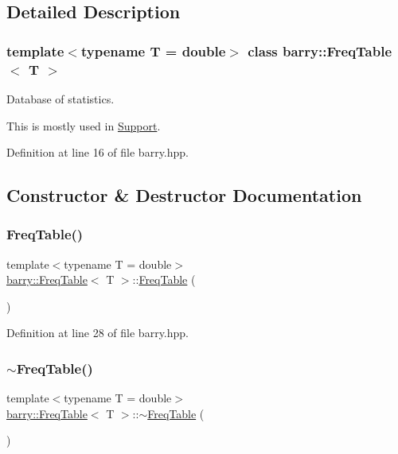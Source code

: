 \subsection{Detailed Description}
\subsubsection*{template$<$typename T = double$>$\newline
class barry\+::\+Freq\+Table$<$ T $>$}

Database of statistics. 

This is mostly used in {\ttfamily \hyperlink{classbarry_1_1_support}{Support}}. 

Definition at line 16 of file barry.\+hpp.



\subsection{Constructor \& Destructor Documentation}
\mbox{\label{classbarry_1_1_freq_table_aea4b22f8097950c3d78e81ab2ed38ae1}} 
\subsubsection{\texorpdfstring{Freq\+Table()}{FreqTable()}}
{\footnotesize\ttfamily template$<$typename T  = double$>$ \\
\hyperlink{classbarry_1_1_freq_table}{barry\+::\+Freq\+Table}$<$ T $>$\+::\hyperlink{classbarry_1_1_freq_table}{Freq\+Table} (\begin{DoxyParamCaption}{ }\end{DoxyParamCaption})\hspace{0.3cm}{\ttfamily [inline]}}



Definition at line 28 of file barry.\+hpp.

\mbox{\label{classbarry_1_1_freq_table_a420a7e4e6740ed7f2b0db1a238f53713}} 
\subsubsection{\texorpdfstring{$\sim$\+Freq\+Table()}{~FreqTable()}}
{\footnotesize\ttfamily template$<$typename T  = double$>$ \\
\hyperlink{classbarry_1_1_freq_table}{barry\+::\+Freq\+Table}$<$ T $>$\+::$\sim$\hyperlink{classbarry_1_1_freq_table}{Freq\+Table} (\begin{DoxyParamCaption}{ }\end{DoxyParamCaption})\hspace{0.3cm}{\ttfamily [inline]}}



